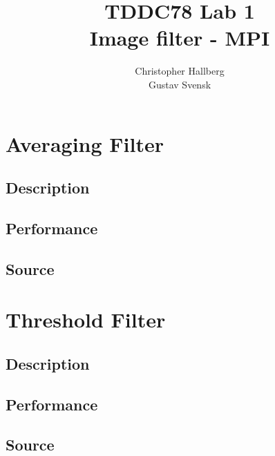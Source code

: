 \documentclass[a4paper, 12pt]{article}
\begin{document}
\title{TDDC78 Lab 1\\
        Image filter - MPI}
\author{Christopher Hallberg \\
        Gustav Svensk}
\maketitle

\thispagestyle{empty}

\newpage
\setcounter{page}{1}
\tableofcontents
\newpage

\section{Averaging Filter}

\subsection{Description}
\subsection{Performance}
\subsection{Source}

\section{Threshold Filter}
\subsection{Description}
\subsection{Performance}
\subsection{Source}
\end{document}
